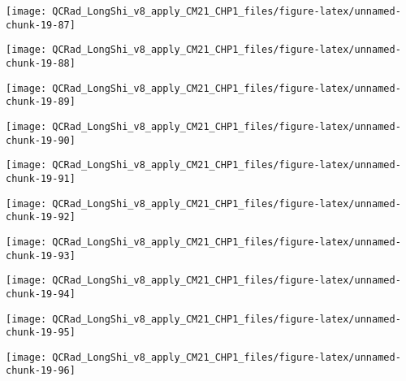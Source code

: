 \documentclass[
  10pt,
  a4paper,oneside]{article}
\begin{document}
\begin{center}\texttt{[image: QCRad\_LongShi\_v8\_apply\_CM21\_CHP1\_files/figure-latex/unnamed-chunk-19-87]} \end{center}

\begin{center}\texttt{[image: QCRad\_LongShi\_v8\_apply\_CM21\_CHP1\_files/figure-latex/unnamed-chunk-19-88]} \end{center}

\begin{center}\texttt{[image: QCRad\_LongShi\_v8\_apply\_CM21\_CHP1\_files/figure-latex/unnamed-chunk-19-89]} \end{center}

\begin{center}\texttt{[image: QCRad\_LongShi\_v8\_apply\_CM21\_CHP1\_files/figure-latex/unnamed-chunk-19-90]} \end{center}

\begin{center}\texttt{[image: QCRad\_LongShi\_v8\_apply\_CM21\_CHP1\_files/figure-latex/unnamed-chunk-19-91]} \end{center}

\begin{center}\texttt{[image: QCRad\_LongShi\_v8\_apply\_CM21\_CHP1\_files/figure-latex/unnamed-chunk-19-92]} \end{center}

\begin{center}\texttt{[image: QCRad\_LongShi\_v8\_apply\_CM21\_CHP1\_files/figure-latex/unnamed-chunk-19-93]} \end{center}

\begin{center}\texttt{[image: QCRad\_LongShi\_v8\_apply\_CM21\_CHP1\_files/figure-latex/unnamed-chunk-19-94]} \end{center}

\begin{center}\texttt{[image: QCRad\_LongShi\_v8\_apply\_CM21\_CHP1\_files/figure-latex/unnamed-chunk-19-95]} \end{center}

\begin{center}\texttt{[image: QCRad\_LongShi\_v8\_apply\_CM21\_CHP1\_files/figure-latex/unnamed-chunk-19-96]} \end{center}
\end{document}
